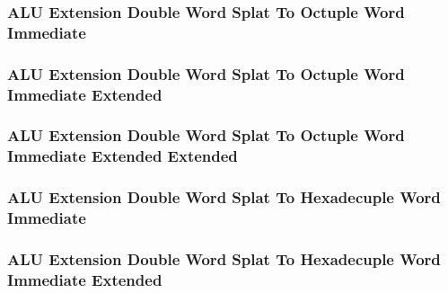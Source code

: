 \subsubsection[{\small ALU Extension Double Word Splat To Octuple Word Immediate}]{ALU Extension Double Word Splat To Octuple Word Immediate} \label{sec:format-ALU-XSDOI}



\subsubsection[{\small ALU Extension Double Word Splat To Octuple Word Immediate Extended}]{ALU Extension Double Word Splat To Octuple Word Immediate Extended} \label{sec:format-ALU-XSDOI.X}



\subsubsection[{\small ALU Extension Double Word Splat To Octuple Word Immediate Extended Extended}]{ALU Extension Double Word Splat To Octuple Word Immediate Extended Extended} \label{sec:format-ALU-XSDOI.Y}



\subsubsection[{\small ALU Extension Double Word Splat To Hexadecuple Word Immediate}]{ALU Extension Double Word Splat To Hexadecuple Word Immediate} \label{sec:format-ALU-XSDXI}



\subsubsection[{\small ALU Extension Double Word Splat To Hexadecuple Word Immediate Extended}]{ALU Extension Double Word Splat To Hexadecuple Word Immediate Extended} \label{sec:format-ALU-XSDXI.X}




